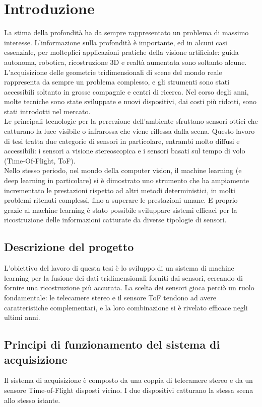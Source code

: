 \chapter{Introduzione}  
La stima della profondità ha da sempre rappresentato un problema di massimo interesse. L'informazione sulla profondità è importante, ed in alcuni casi essenziale, per molteplici applicazioni pratiche della visione artificiale: guida autonoma, robotica, ricostruzione 3D e realtà aumentata sono soltanto alcune. \\
L'acquisizione delle geometrie tridimensionali di scene del mondo reale rappresenta da sempre un problema complesso, e gli strumenti sono stati accessibili soltanto in grosse compagnie e centri di ricerca. Nel corso degli anni, molte tecniche sono state sviluppate e nuovi dispositivi, dai costi più ridotti, sono stati introdotti nel mercato.\\
Le principali tecnologie per la percezione dell'ambiente sfruttano sensori ottici che catturano la luce visibile o infrarossa che viene riflessa dalla scena. Questo lavoro di tesi tratta due categorie di sensori in particolare, entrambi molto diffusi e accessibili: i sensori a visione stereoscopica e i sensori basati sul tempo di volo (Time-Of-Flight, ToF).\\
Nello stesso periodo, nel mondo della computer vision, il machine learning (e deep learning in particolare) si è dimostrato uno strumento che ha ampiamente incrementato le prestazioni rispetto ad altri metodi deterministici, in molti problemi ritenuti complessi, fino a superare le prestazioni umane. E proprio grazie al machine learning è stato possibile sviluppare sistemi efficaci per la ricostruzione delle informazioni catturate da diverse tipologie di sensori.

\section{Descrizione del progetto}
L'obiettivo del lavoro di questa tesi è lo sviluppo di un sistema di machine learning per la fusione dei dati tridimensionali forniti dai sensori, cercando di fornire una ricostruzione più accurata. La scelta dei sensori gioca perciò un ruolo fondamentale: le telecamere stereo e il sensore ToF tendono ad avere caratteristiche complementari, e la loro combinazione si è rivelato efficace negli ultimi anni. 

\section{Principi di funzionamento del sistema di acquisizione}
Il sistema di acquisizione è composto da una coppia di telecamere stereo e da un sensore Time-of-Flight disposti vicino. I due dispositivi catturano la stessa scena allo stesso istante.

